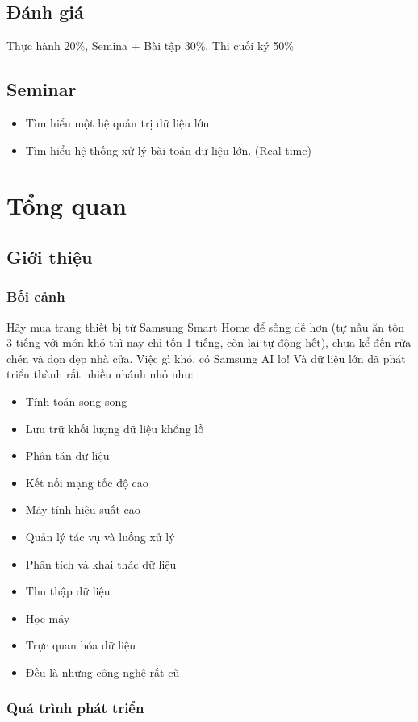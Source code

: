 \section{ Đánh giá }
\tab Thực hành 20\%, Semina + Bài tập 30\%, Thi cuối ký 50\% 
\section{ Seminar}
\begin{itemize}
	\item Tìm hiểu một hệ quản trị dữ liệu lớn
	\item Tìm hiểu hệ thống xử lý bài toán dữ liệu lớn. (Real-time)
\end{itemize}
\chapter{ Tổng quan }
\section{ Giới thiệu }
\subsection{ Bối cảnh }
\tab Hãy mua trang thiết bị từ Samsung Smart Home để sống dễ hơn (tự nấu ăn tốn 
3 tiếng với món khó thì nay chỉ tốn 1 tiếng, còn lại tự động hết), chưa kể đến
rửa chén và dọn dẹp nhà cửa. Việc gì khó, có Samsung AI lo! Và dữ liệu lớn
đã phát triển thành rất nhiều nhánh nhỏ như:
\begin{itemize}
	\item Tính toán song song
	\item Lưu trữ khối lượng dữ liệu khổng lồ
	\item Phân tán dữ liệu
	\item Kết nối mạng tốc độ cao
	\item Máy tính hiệu suất cao
	\item Quản lý tác vụ và luồng xử lý
	\item Phân tích và khai thác dữ liệu
	\item Thu thập dữ liệu
	\item Học máy
	\item Trực quan hóa dữ liệu
	\item Đều là những công nghệ rất cũ
\end{itemize}

\subsection{ Quá trình phát triển }
